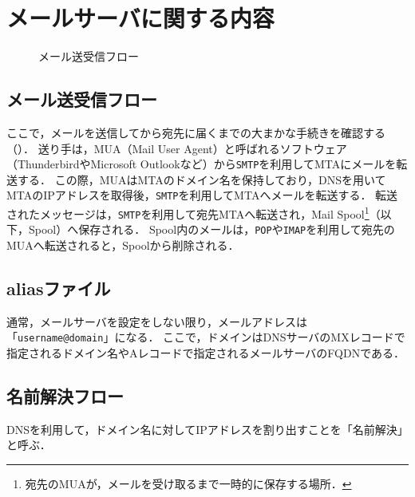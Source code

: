 \chapter{メールサーバに関する内容}
\begin{wrapfigure}{r}[0mm]{.43\textwidth}
    
    \caption{メール送受信フロー}
    \label{fig:メール送受信フロー}
    \vspace{-1cm}
\end{wrapfigure}
\newcommand{\smtp}{\texttt{SMTP}}
\newcommand{\pop}{\texttt{POP}}
\newcommand{\imap}{\texttt{IMAP}}
\section{メール送受信フロー}
ここで，メールを送信してから宛先に届くまでの大まかな手続きを確認する（）．
送り手は，MUA（Mail User Agent）と呼ばれるソフトウェア（ThunderbirdやMicrosoft Outlookなど）から\smtp を利用してMTAにメールを転送する．
この際，MUAはMTAのドメイン名を保持しており，DNSを用いてMTAのIPアドレスを取得後，\smtp を利用してMTAへメールを転送する．
転送されたメッセージは，\smtp を利用して宛先MTAへ転送され，Mail Spool\footnote{宛先のMUAが，メールを受け取るまで一時的に保存する場所．}（以下，Spool）へ保存される．
Spool内のメールは，\pop や\imap を利用して宛先のMUAへ転送されると，Spoolから削除される．
\section{aliasファイル}
通常，メールサーバを設定をしない限り，メールアドレスは「\texttt{username@domain}」になる．
ここで，ドメインはDNSサーバのMXレコードで指定されるドメイン名やAレコードで指定されるメールサーバのFQDNである．

\section{名前解決フロー}
DNSを利用して，ドメイン名に対してIPアドレスを割り出すことを「名前解決」と呼ぶ．